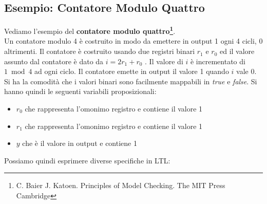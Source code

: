 \documentclass[a4paper,12pt, oneside]{book}
\begin{document}
\subsection{Esempio: Contatore Modulo Quattro}
Vediamo l'esempio del \textbf{contatore modulo quattro\footnote{C. Baier
    J. Katoen. Principles of Model Checking. The MIT Press Cambridge}}.\\

Un contatore modulo 4 è costruito in modo da emettere in output 1 ogni 4 cicli,
0 altrimenti. Il contatore è 
costruito usando due registri binari $r_1$ e $r_0$ ed il valore assunto dal
contatore è dato da $i = 2r_1 + r_0$ . Il valore di $i$ è incrementato di $1
\bmod 4$ ad ogni ciclo. Il contatore emette in output il valore 1 quando $i$
vale 0. Si ha la comodità che i valori binari sono facilmente mappabili in
\textit{true} e \textit{false}. Si hanno quindi le seguenti variabili
proposizionali:
\begin{itemize}
  \item $r_0$ che rappresenta l'omonimo registro e contiene il valore 1
  \item $r_1$ che rappresenta l'omonimo registro e contiene il valore 1 
  \item $y$ che è il valore in output e contiene 1
\end{itemize}
Possiamo quindi esprimere diverse specifiche in LTL:
\end{document}
